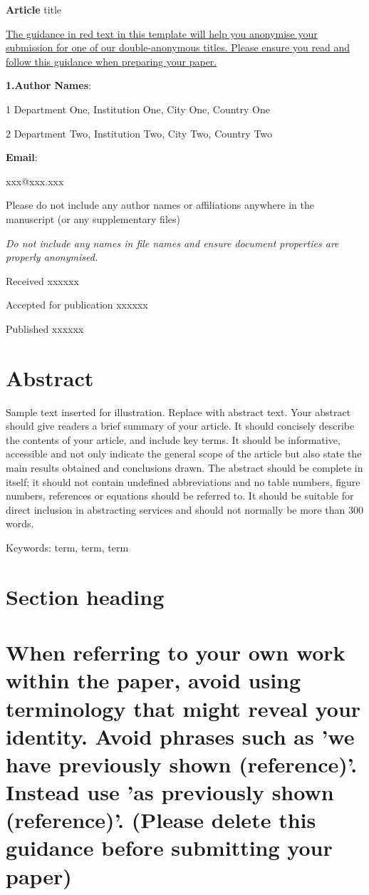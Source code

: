 \documentclass{article}
\author{ioppublishing@ioppublishing.org}
\begin{document}
\textbf{Article} title

\underline{The}\underline{ }\underline{guidance in }\underline{red text in }\underline{this template }\underline{will}\underline{ help you anonymise your submission for one of our double-anonymous titles. Please ensure you read and follow this guidance when preparing your paper.}

\textbf{1.}\textbf{Author Names}: 

1 Department One, Institution One, City One, Country One

2 Department Two, Institution Two, City Two, Country Two

\textbf{Email}:

 xxx@xxx.xxx

Please do not include any author names or affiliations anywhere in the manuscript (or any supplementary files)

\textit{Do not include any names in file names and ensure document properties are properly anonymised.}

Received xxxxxx

Accepted for publication xxxxxx

Published xxxxxx

\section{Abstract}

Sample text inserted for illustration. Replace with abstract text. Your abstract should give readers a brief summary of your article. It should concisely describe the contents of your article, and include key terms. It should be informative, accessible and not only indicate the general scope of the article but also state the main results obtained and conclusions drawn. The abstract should be complete in itself; it should not contain undefined abbreviations and no table numbers, figure numbers, references or equations should be referred to. It should be suitable for direct inclusion in abstracting services and should not normally be more than 300 words.

Keywords: term, term, term

\section{Section heading}

\section{When referring to your own work within the paper, avoid using terminology that might reveal your identity. Avoid phrases such as 'we have previously shown (reference)'. Instead use 'as previously shown (reference)'. (Please delete this guidance before submitting your paper)}
\end{document}
